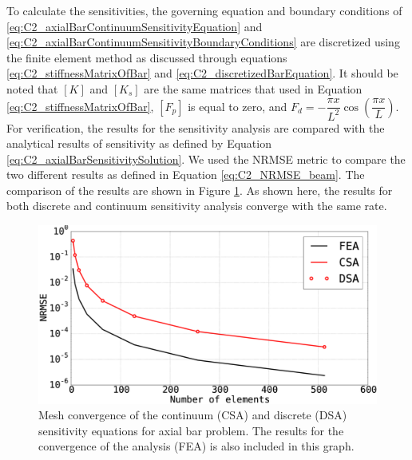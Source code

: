To calculate the sensitivities, the governing equation and boundary conditions of \eqref{eq:C2_axialBarContinuumSensitivityEquation} and \eqref{eq:C2_axialBarContinuumSensitivityBoundaryConditions} are discretized using the finite element method as discussed through equations \eqref{eq:C2_stiffnessMatrixOfBar} and \eqref{eq:C2_discretizedBarEquation}. It should be noted that $[K]$ and $[K_s]$ are the same matrices that used in Equation \eqref{eq:C2_stiffnessMatrixOfBar}, $[F_p]$ is equal to zero, and $F_d = -\dfrac{\pi x}{L^2} \cos \left( \dfrac{\pi x}{L} \right)$. For verification, the results for the sensitivity analysis are compared with the analytical results of sensitivity as defined by Equation \eqref{eq:C2_axialBarSensitivitySolution}. We used the NRMSE metric to compare the two different results as defined in Equation \eqref{eq:C2_NRMSE_beam}. The comparison of the results are shown in Figure \ref{fig:C2_continuumSensitivityResults}. As shown here, the results for both discrete and continuum sensitivity analysis converge with the same rate.
%
\begin{figure}[h]
    \centering
    \includegraphics[width=14.00cm]{Chapter_2/figure/axial_bar_continuum_sensitivity_analysis.eps}
    \caption{Mesh convergence of the continuum (CSA) and discrete (DSA) sensitivity equations for axial bar problem. The results for the convergence of the analysis (FEA) is also included in this graph.}
    \label{fig:C2_continuumSensitivityResults}
\end{figure}
%